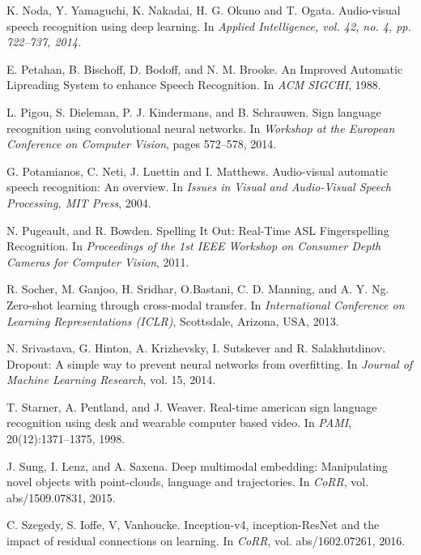 \begin{thebibliography}{99}
  K. Noda, Y. Yamaguchi, K. Nakadai, H. G. Okuno and T. Ogata. Audio-visual
  speech recognition using deep learning.  In \textit{Applied Intelligence,
  vol. 42, no. 4, pp. 722–737, 2014.}

  E. Petahan, B. Bischoff, D. Bodoff, and N. M. Brooke. An Improved
  Automatic Lipreading System to enhance Speech Recognition.
  In \textit{ACM SIGCHI}, 1988.

 L. Pigou, S. Dieleman, P. J. Kindermans, and B. Schrauwen.
  Sign language recognition using convolutional neural networks. In
  \textit{Workshop at the European Conference on Computer Vision},
  pages 572--578, 2014.

  G. Potamianos, C. Neti, J. Luettin and  I. Matthews. Audio-visual
  automatic speech recognition: An overview. In \textit{Issues in Visual
  and Audio-Visual Speech Processing, MIT Press}, 2004.

  N. Pugeault, and R. Bowden. Spelling It Out: Real-Time ASL
  Fingerspelling Recognition. In \textit{Proceedings of the 1st IEEE
  Workshop on Consumer Depth Cameras for Computer Vision}, 2011.

  R. Socher, M. Ganjoo, H. Sridhar, O.Bastani, C. D. Manning, and
  A. Y. Ng. Zero-shot learning through cross-modal transfer.
  In \textit{International Conference on Learning Representations (ICLR)},
  Scottsdale, Arizona, USA, 2013.

  N. Srivastava, G. Hinton, A. Krizhevsky, I. Sutskever and R. Salakhutdinov.
  Dropout: A simple way to prevent neural networks from overfitting. In
  \textit{Journal of Machine Learning Research}, vol. 15, 2014.

  T. Starner, A. Pentland, and J. Weaver. Real-time american sign language
  recognition using desk and wearable computer based video. 
  In \textit{PAMI}, 20(12):1371–1375, 1998.

  J. Sung, I. Lenz, and A. Saxena. Deep multimodal embedding:
  Manipulating novel objects with point-clouds, language and trajectories.
  In \textit{CoRR}, vol. abs/1509.07831, 2015.

  C. Szegedy, S. Ioffe, V, Vanhoucke. Inception-v4, inception-ResNet and the
  impact of residual connections on learning. In \textit{CoRR},
  vol. abs/1602.07261, 2016.


\end{thebibliography}
